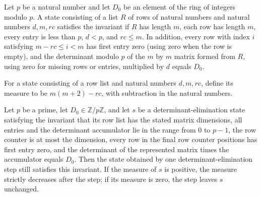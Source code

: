 \begin{definition}
\label{Complexity.BinArith.CInv}
\leanok
{}
Let $p$ be a natural number and let $D_0$ be an element of the ring of integers modulo
$p$. A state consisting of a list $R$ of rows of natural numbers and natural numbers
$d,m,rc$ satisfies the invariant if $R$ has length $m$, each row has length $m$, every
entry is less than $p$, $d<p$, and $rc\le m$. In addition, every row with index $i$
satisfying $m-rc\le i<m$ has first entry zero (using zero when the row is empty), and
the determinant modulo $p$ of the $m$ by $m$ matrix formed from $R$, using zero for
missing rows or entries, multiplied by $d$ equals $D_0$.
\end{definition}

\begin{definition}
\label{Complexity.BinArith.dMeasure}
\leanok
{}
For a state consisting of a row list and natural numbers $d,m,rc$, define its measure to
be $m(m+2)-rc$, with subtraction in the natural numbers.
\end{definition}

\begin{theorem}
\label{Complexity.BinArith.cInv_step}
\leanok
{}
Let $p$ be a prime, let $D_0\in\mathbb Z/p\mathbb Z$, and let $s$ be a
determinant-elimination state satisfying the invariant that its row list has the stated
matrix dimensions, all entries and the determinant accumulator lie in the range from $0$
to $p-1$, the row counter is at most the dimension, every row in the final $\text{row
counter}$ positions has first entry zero, and the determinant of the represented matrix
times the accumulator equals $D_0$. Then the state obtained by one
determinant-elimination step still satisfies this invariant. If the measure of $s$ is
positive, the measure strictly decreases after the step; if its measure is zero, the
step leaves $s$ unchanged.
\end{theorem}

